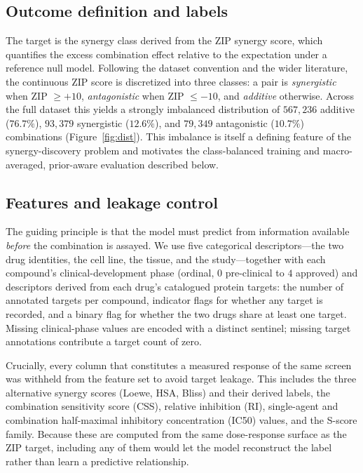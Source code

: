 \documentclass{bmcart}
\begin{document}
\subsection*{Outcome definition and labels}
The target is the synergy class derived from the ZIP synergy score, which quantifies the excess
combination effect relative to the expectation under a reference null model. Following the dataset
convention and the wider literature, the continuous ZIP score is discretized into three classes: a
pair is \emph{synergistic} when ZIP $\geq +10$, \emph{antagonistic} when ZIP $\leq -10$, and
\emph{additive} otherwise. Across the full dataset this yields a strongly imbalanced distribution of
$567{,}236$ additive ($76.7\%$), $93{,}379$ synergistic ($12.6\%$), and $79{,}349$ antagonistic
($10.7\%$) combinations (Figure~\ref{fig:dist}). This imbalance is itself a defining feature of the
synergy-discovery problem and motivates the class-balanced training and macro-averaged, prior-aware
evaluation described below.

\subsection*{Features and leakage control}
The guiding principle is that the model must predict from information available \emph{before} the
combination is assayed. We use five categorical descriptors---the two drug identities, the cell line,
the tissue, and the study---together with each compound's clinical-development phase (ordinal,
$0$ pre-clinical to $4$ approved) and descriptors derived from each drug's catalogued protein targets:
the number of annotated targets per compound, indicator flags for whether any target is recorded, and
a binary flag for whether the two drugs share at least one target. Missing clinical-phase values are
encoded with a distinct sentinel; missing target annotations contribute a target count of zero.

Crucially, every column that constitutes a measured response of the same screen was withheld from the
feature set to avoid target leakage. This includes the three alternative synergy scores (Loewe, HSA,
Bliss) and their derived labels, the combination sensitivity score (CSS), relative inhibition (RI),
single-agent and combination half-maximal inhibitory concentration (IC50) values, and the S-score
family. Because these are computed from the same dose-response surface as the ZIP target, including any
of them would let the model reconstruct the label rather than learn a predictive relationship.
\end{document}
